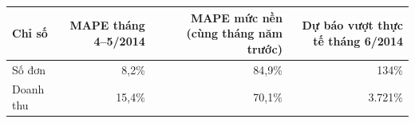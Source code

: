 \begin{tabular}{lrrr}
\toprule
Chỉ số & MAPE tháng 4--5/2014 & MAPE mức nền (cùng tháng năm trước) & Dự báo vượt thực tế tháng 6/2014 \\
\midrule
Số đơn & 8,2\% & 84,9\% & 134\% \\
Doanh thu & 15,4\% & 70,1\% & 3.721\% \\
\bottomrule
\end{tabular}
